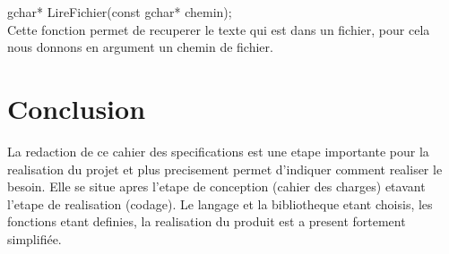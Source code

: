 \documentclass[a4]{article}
\begin{document}
	gchar* LireFichier(const gchar* chemin);\\
		Cette fonction permet de recuperer le texte qui est dans un fichier, pour cela nous donnons en argument un chemin de fichier.\\
	
	\section{Conclusion}
	La redaction de ce cahier des specifications est une etape importante pour la realisation du projet et plus precisement permet d'indiquer comment realiser le besoin. Elle se situe apres l'etape de conception (cahier des charges) etavant l'etape de realisation (codage). Le langage et la bibliotheque etant choisis, les fonctions etant definies, la realisation du produit est a present fortement simplifiée. 
	
	
\end{document}
